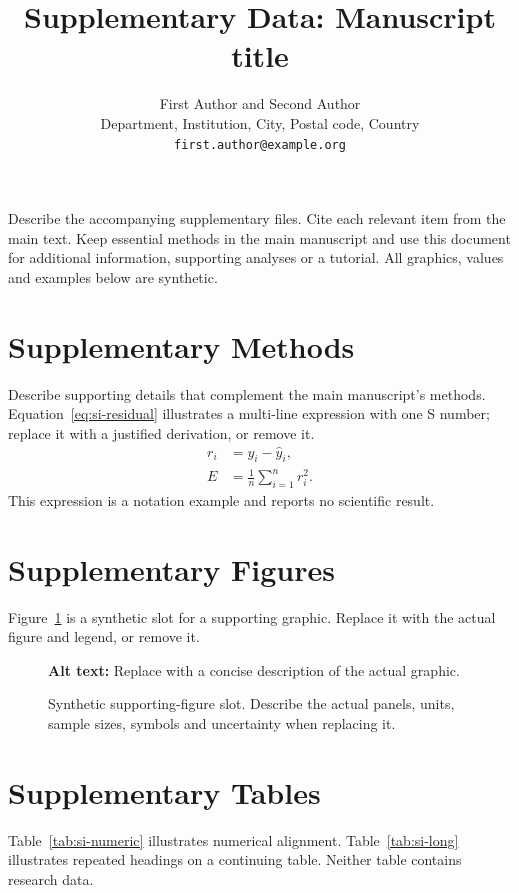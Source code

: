 \documentclass[11pt,a4paper]{article}
\title{Supplementary Data: Manuscript title}
\author{First Author and Second Author\\
  \small Department, Institution, City, Postal code, Country\\
  \small \texttt{first.author@example.org}}
\date{}
\begin{document}
\maketitle
Describe the accompanying supplementary files. Cite each relevant item
from the main text. Keep essential methods in the main manuscript and
use this document for additional information, supporting analyses or a
tutorial. All graphics, values and examples below are synthetic.

\section{Supplementary Methods}
Describe supporting details that complement the main manuscript's methods.
Equation~\eqref{eq:si-residual} illustrates a multi-line expression with one
S number; replace it with a justified derivation, or remove it.
\begin{equation}
\begin{split}
 r_i&=y_i-\widehat y_i,\\
 E&=\frac{1}{n}\sum_{i=1}^{n}r_i^2.
\end{split}\label{eq:si-residual}
\end{equation}
This expression is a notation example and reports no scientific result.

\section{Supplementary Figures}
Figure~\ref{fig:si-slot} is a synthetic slot for a supporting graphic.
Replace it with the actual figure and legend, or remove it.
\begin{figure}[htbp]
\centering
{}
\caption{Synthetic supporting-figure slot. Describe the actual panels,
units, sample sizes, symbols and uncertainty when replacing it.}
\label{fig:si-slot}
\par\smallskip\small\raggedright
\textbf{Alt text:} Replace with a concise description of the actual graphic.
\end{figure}

\section{Supplementary Tables}
Table~\ref{tab:si-numeric} illustrates numerical alignment.
Table~\ref{tab:si-long} illustrates repeated headings on a continuing table.
Neither table contains research data.
\end{document}
